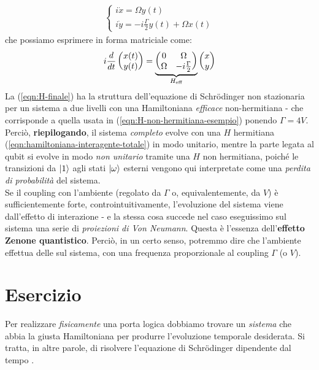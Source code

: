\documentclass[../../InformazioneQuantistica.tex]{subfiles}
\begin{document}
\begin{align*}
\begin{cases}
i\dot{x} = \Omega y(t)\\
i\dot{y} = -i\frac{\Gamma}{2}y(t) + \Omega x(t)
\end{cases}
\end{align*}
che possiamo esprimere in forma matriciale come:
\begin{align}
i\frac{d}{dt}\begin{pmatrix} x(t)\\ y(t)\end{pmatrix} = 
\underbrace{\begin{pmatrix}
0 & \Omega\\ \Omega & -i\frac{\Gamma}{2}\end{pmatrix}}_{H_{\operatorname{eff}}}
 \begin{pmatrix}x \\ y \end{pmatrix}
 \label{eqn:H-finale}
\end{align}
La (\ref{eqn:H-finale}) ha la struttura dell'equazione di Schr\"odinger non stazionaria per un sistema a due livelli con una Hamiltoniana \textit{efficace} non-hermitiana - che corrisponde a quella usata in (\ref{eqn:H-non-hermitiana-esempio}) ponendo $\Gamma=4V$.\\

Perciò, \textbf{riepilogando}, il sistema \textit{completo} evolve con una $H$ hermitiana (\ref{eqn:hamiltoniana-interagente-totale}) in modo unitario, mentre la parte legata al qubit si evolve in modo \textit{non unitario} tramite una $H$ non hermitiana, poiché le transizioni da $\Ket{1}$ agli stati $\Ket{\omega}$ esterni vengono qui interpretate come una \textit{perdita di probabilità} del sistema.\\
Se il coupling con l'ambiente (regolato da $\Gamma$ o, equivalentemente, da $V$) è sufficientemente forte, controintuitivamente, l'evoluzione del sistema viene  dall'effetto di interazione - e la stessa cosa succede nel caso eseguissimo sul sistema una serie di \textit{proiezioni di Von Neumann}. Questa è l'essenza dell'\textbf{effetto Zenone quantistico}. Perciò, in un certo senso, potremmo dire che l'ambiente effettua delle  sul sistema, con una frequenza proporzionale al coupling $\Gamma$ (o $V$).

\section{Esercizio \theEsercizio} 
Per realizzare \textit{fisicamente} una porta logica dobbiamo trovare un \textit{sistema} che abbia la giusta Hamiltoniana per produrre l'evoluzione temporale desiderata. Si tratta, in altre parole, di risolvere l'equazione di Schr\"odinger dipendente dal tempo .\\
\end{document}
